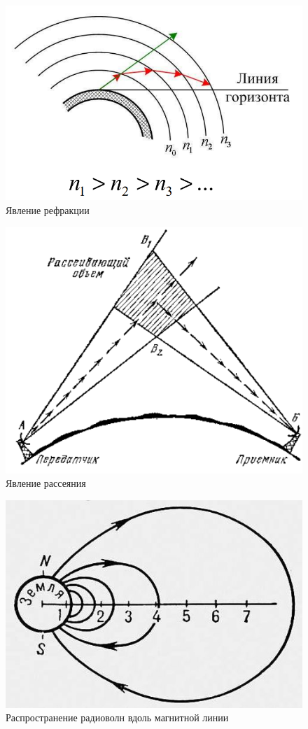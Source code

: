 \documentclass[a4paper,12pt]{article} %
\begin{document}
\begin{figure}
\centering
\includegraphics[width=12cm]{1. refraction}
\caption{Явление рефракции}
\end{figure}

\begin{figure}
\centering
\includegraphics[width=12cm]{2. rasseianie}
\caption{Явление рассеяния}
\end{figure}

\begin{figure}
\centering
\includegraphics[width=12cm]{3. magnitpole}
\caption{Распространение радиоволн вдоль магнитной линии}
\end{figure}
\end{document}
